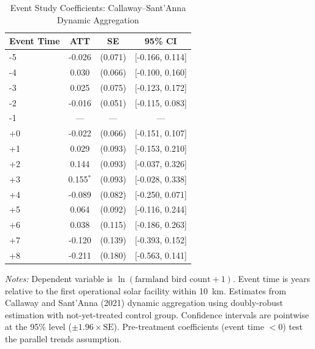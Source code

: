 \begin{table}[t]
\centering
\begin{threeparttable}
\caption{Event Study Coefficients: Callaway--Sant'Anna Dynamic Aggregation}
\label{tab:eventstudy}
\begin{tabular}{lccc}
\toprule
Event Time & ATT & SE & 95\% CI \\
\midrule
-5 & -0.026 & (0.071) & [-0.166, 0.114] \\
-4 & 0.030 & (0.066) & [-0.100, 0.160] \\
-3 & 0.025 & (0.075) & [-0.123, 0.172] \\
-2 & -0.016 & (0.051) & [-0.115, 0.083] \\
-1 & --- & --- & --- \\
+0 & -0.022 & (0.066) & [-0.151, 0.107] \\
+1 & 0.029 & (0.093) & [-0.153, 0.210] \\
+2 & 0.144 & (0.093) & [-0.037, 0.326] \\
+3 & 0.155$^{*}$ & (0.093) & [-0.028, 0.338] \\
+4 & -0.089 & (0.082) & [-0.250, 0.071] \\
+5 & 0.064 & (0.092) & [-0.116, 0.244] \\
+6 & 0.038 & (0.115) & [-0.186, 0.263] \\
+7 & -0.120 & (0.139) & [-0.393, 0.152] \\
+8 & -0.211 & (0.180) & [-0.563, 0.141] \\
\bottomrule
\end{tabular}
\begin{tablenotes}[flushleft]\small
\item \textit{Notes:} Dependent variable is $\ln(\text{farmland bird count} + 1)$. Event time is years relative to the first operational solar facility within 10~km. Estimates from Callaway and Sant'Anna (2021) dynamic aggregation using doubly-robust estimation with not-yet-treated control group. Confidence intervals are pointwise at the 95\% level ($\pm 1.96 \times \text{SE}$). Pre-treatment coefficients (event time $< 0$) test the parallel trends assumption.
\end{tablenotes}
\end{threeparttable}
\end{table}

